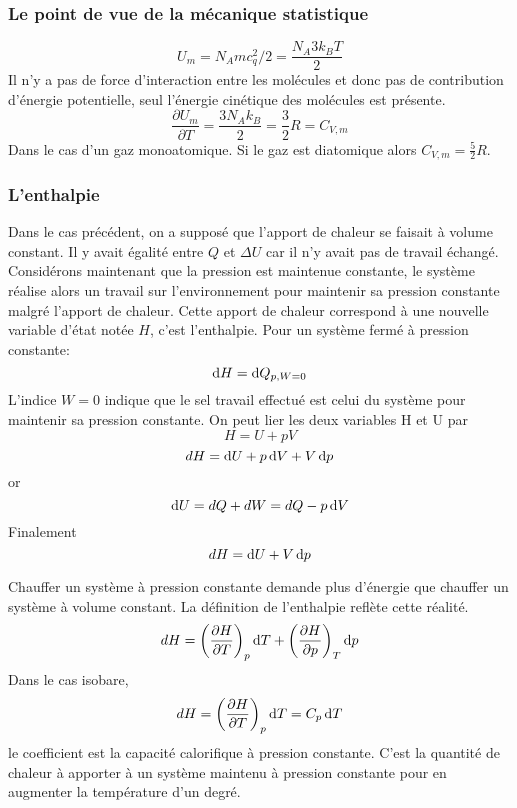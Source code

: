\subsubsection{Le point de vue de la mécanique statistique}
\[ U_m = N_A mc_q^2/2 = \frac{N_A 3k_BT}{2} \]
Il n'y a pas de force d'interaction entre les molécules et
donc pas de contribution d'énergie potentielle,
seul l'énergie cinétique des molécules est présente.
\[ \frac{\partial U_m}{\partial T} = \frac{3N_A k_B}{2} = \frac 32R = C_{V,m} \]
Dans le cas d'un gaz monoatomique.
Si le gaz est diatomique alors $C_{V,m} = \frac 52R$.

\subsubsection{L'enthalpie}
Dans le cas précédent, on a supposé que
l'apport de chaleur se faisait à volume constant.
Il y avait égalité entre $Q$ et $\Delta U$
car il n'y avait pas de travail échangé.
Considérons maintenant que la pression est maintenue constante,
le système réalise alors un travail sur l'environnement pour maintenir
sa pression constante malgré l'apport de chaleur.
Cette apport de chaleur correspond à une nouvelle variable d'état notée $H$,
c'est l'enthalpie.
Pour un système fermé à pression constante:
\[ \operatorname{d}\! H = \operatorname{d}\! Q_{p,W = 0} \]
L'indice $W = 0$ indique que le sel travail effectué est
celui du système pour maintenir sa pression constante.
On peut lier les deux variables H et U par
\[ H = U+pV \]
\[ dH = \operatorname{d}\! U+p\operatorname{d}\! V+V\operatorname{d}\! p \]
or
\[ \operatorname{d}\! U = dQ+dW = dQ-p\operatorname{d}\! V \]
Finalement
\[ dH = \operatorname{d}\! U+V\operatorname{d}\! p \]

Chauffer un système à pression constante demande plus d'énergie
que chauffer un système à volume constant.
La définition de l'enthalpie reflète cette réalité.
\[ dH = \left(\frac{\partial H}{\partial T}\right)_p \operatorname{d}\! T +
\left(\frac{\partial H}{\partial p}\right)_T \operatorname{d}\! p \]
Dans le cas isobare,
\[ dH = \left(\frac{\partial H}{\partial T}\right)_p \operatorname{d}\! T = C_p\operatorname{d}\! T \]
le coefficient est la capacité calorifique à pression constante.
C'est la quantité de chaleur à apporter à un système maintenu à pression
constante pour en augmenter la température d'un degré.

